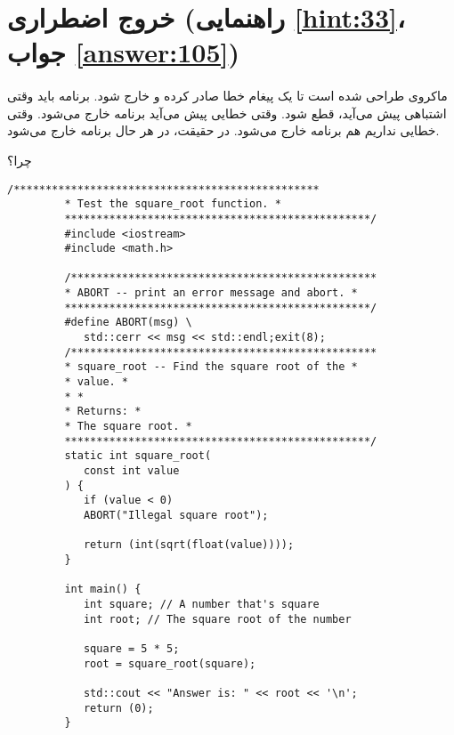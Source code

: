 \section[خروج اضطراری]{خروج اضطراری \protect{} (راهنمایی \ref{hint:33}، جواب \ref{answer:105})}
\paragraph{}\label{prog:75}
ماکروی  طراحی شده است تا یک پیغام خطا صادر کرده و خارج شود. برنامه باید وقتی اشتباهی پیش می‌آید، قطع شود.
وقتی خطایی پیش می‌آید برنامه خارج می‌شود. وقتی خطایی نداریم هم برنامه خارج می‌شود. در حقیقت، در هر حال برنامه خارج می‌شود.

چرا؟

\begin{LTR}
    \begin{lstlisting}[style=C++Style]
         /************************************************
         * Test the square_root function. *
         ************************************************/
         #include <iostream>
         #include <math.h>

         /************************************************
         * ABORT -- print an error message and abort. *
         ************************************************/
         #define ABORT(msg) \
         	std::cerr << msg << std::endl;exit(8);
         /************************************************
         * square_root -- Find the square root of the *
         * value. *
         * *
         * Returns: *
         * The square root. *
         ************************************************/
         static int square_root(
         	const int value
         ) {
         	if (value < 0)
         	ABORT("Illegal square root");

         	return (int(sqrt(float(value))));
         }

         int main() {
         	int square; // A number that's square
         	int root; // The square root of the number

         	square = 5 * 5;
         	root = square_root(square);

         	std::cout << "Answer is: " << root << '\n';
         	return (0);
         }
    \end{lstlisting}
\end{LTR}